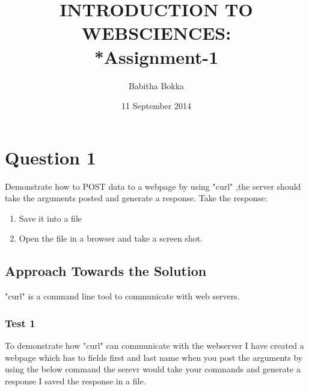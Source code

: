 \documentclass[12pt]{article}
\begin{document}
\begin{titlepage}

\title{INTRODUCTION TO WEBSCIENCES:\\*Assignment-1}
\author{Babitha Bokka}
\date{11 September 2014}
\maketitle

\end{titlepage}

\tableofcontents
\newpage
\section{Question 1}
Demonstrate how to POST data to a webpage by using "curl" ,the server should take the arguments posted and generate a response. Take the response:
\begin{enumerate}
	\item Save it into a file
	\item Open the file in a browser and take a screen shot.
\end{enumerate}
\subsection{Approach Towards the Solution}
"curl" is a command line tool to communicate with web servers.

\subsubsection{Test 1}
To demonstrate how "curl" can communicate with the webserver I have created a webpage which has to fields first and last name when you post the arguments by using the below command the serevr would take your commands and generate a  response I saved the response in a file.
\end{document}
